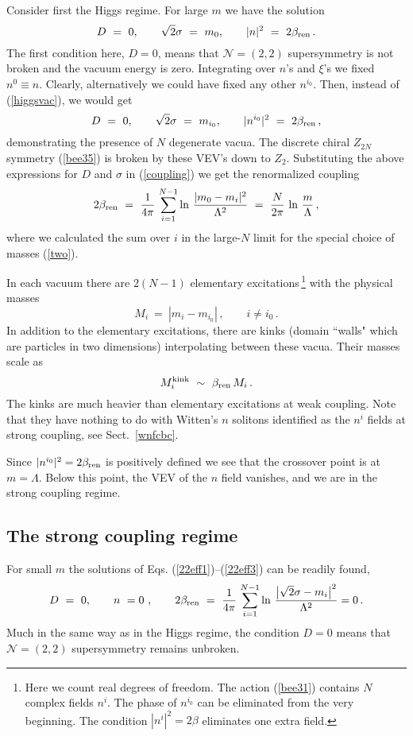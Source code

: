 \documentclass[epsfig,12pt]{article}
\def\beq{\begin{equation}}
\def\eeq{\end{equation}}
\def\beq{\begin{equation}}
\def\eeq{\end{equation}}
\newcommand{\ntwot}{${\mathcal N}= \left(2,2\right) $ }
\begin{document}
Consider first the Higgs regime.
For large $m$ we have the solution
\beq
D~=~0,\qquad \sqrt{2}\sigma~=~m_0,\qquad |n|^2~=~2\beta_{\rm ren} \,.
\label{higgsvac}
\eeq
The first condition here, $D=0$, means that \ntwot supersymmetry is not broken and the vacuum
energy is zero. Integrating over $n$'s and $\xi$'s we fixed $n^{0}\equiv n$. Clearly,
alternatively  we could have fixed
any other $n^{i_0}$. Then, instead of (\ref{higgsvac}), we would get
\beq
D~=~0,\qquad \sqrt{2}\sigma~=~m_{i_0},\qquad |n^{i_0}|^2~=~2\beta_{\rm ren}\,,
\label{higgsvacN}
\eeq
demonstrating the  presence of $N$ degenerate vacua. The discrete chiral $Z_{2N}$ symmetry (\ref{bee35})
is broken by these VEV's down to $Z_2$. Substituting 
the above  expressions   for $D$ and $\sigma$ in (\ref{coupling})
we get the renormalized coupling 
\beq
2\beta_{\rm ren}~=~\frac{1}{4\pi}\, 
\sum_{i=1}^{N-1}\ln\, {\frac{|m_{0}-m_i|^2}{\Lambda^2}}~=~\frac{N}{2\pi}\,\ln\,{\frac{m}{\Lambda}}\, ,
\label{22higgscoupling}
\eeq
where we calculated the sum over $i$ in the large-$N$ limit for the special choice of masses
(\ref{two}).

In each vacuum there are $2(N-1)$ elementary excitations\,\footnote{Here we count
real degrees of
freedom. The action (\ref{bee31}) contains $N$ complex fields
$n^i$.
The phase of $n^{i_0}$ can be eliminated from the very beginning.
The condition $|n^i|^2 = 2\beta$ eliminates one extra field.} 
with the physical masses
\beq
M_i ~=~ |m_i-m_{i_0}|\,,\qquad i\neq i_0\,.
\label{elmass}
\eeq
In addition to the elementary excitations, there are kinks (domain ``walls" which are particles in two
dimensions) interpolating between these vacua. 
Their masses scale as
\beq
M^{\rm kink}_{i} ~\sim~ \beta_{\rm ren}\,M_i \,.
\label{kinkmass}
\eeq
The kinks  are much  heavier than elementary
excitations at weak coupling. Note that they have nothing to do
with Witten's $n$ solitons \cite{W79} identified as the $n^i$ fields at
strong coupling, see Sect.~\ref{wnfcbc}.

Since $|n^{i_0}|^2=2\beta_{\rm ren}$ is positively defined we see that the crossover point is
at $m=\Lambda$. Below this point, the VEV of the $n$ field vanishes,
 and we are in the strong coupling regime.

\subsection{The strong coupling regime}
\label{tscreg}

For small $m$ the
solutions of Eqs. (\ref{22eff1})--(\ref{22eff3}) can be readily found,
\beq
D~=~0,\qquad n~=0~,\qquad
2\beta_{\rm ren}~=~\frac{1}{4\pi}\, 
\sum_{i=1}^{N-1}\ln\, {\frac{\bigl|\sqrt{2}\sigma-m_i\bigr|^2}{\Lambda^2}}=0 \,.
\label{strongvac}
\eeq
Much in the same way as in the Higgs regime, the condition $D=0$ means that   \ntwot
 supersymmetry remains unbroken.
 
\end{document}
